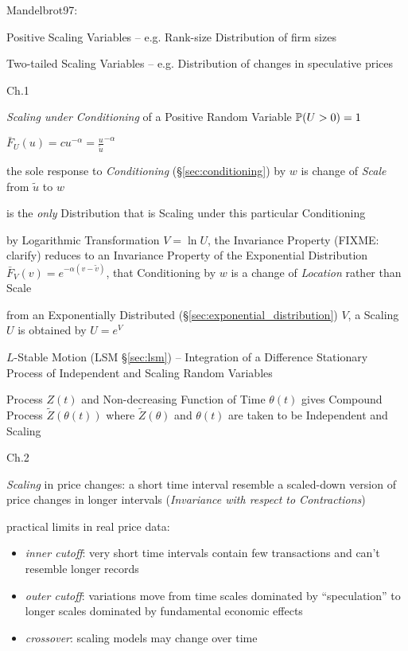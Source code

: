 Mandelbrot97:

Positive Scaling Variables -- e.g. Rank-size Distribution of firm sizes

Two-tailed Scaling Variables -- e.g. Distribution of changes in speculative
prices

Ch.1

\emph{Scaling under Conditioning} of a Positive Random Variable
$\mathbb{P}(U > 0) = 1$

$\bar{F}_U(u) = c u^{-\alpha} = \frac{u}{\tilde{u}}^{-\alpha}$

the sole response to \emph{Conditioning} (\S\ref{sec:conditioning}) by $w$ is
change of \emph{Scale} from $\tilde{u}$ to $w$

is the \emph{only} Distribution that is Scaling under this particular
Conditioning

by Logarithmic Transformation $V = \ln U$, the Invariance Property (FIXME:
clarify) reduces to an Invariance Property of the Exponential Distribution
$\bar{F}_V(v) = e^{-\alpha(v - \tilde{v})}$, that Conditioning by $w$ is a
change of \emph{Location} rather than Scale

from an Exponentially Distributed (\S\ref{sec:exponential_distribution}) $V$, a
Scaling $U$ is obtained by $U = e^V$

\fist $L$-Stable Motion (LSM \S\ref{sec:lsm}) -- Integration of a Difference
Stationary Process of Independent and Scaling Random Variables

Process $Z(t)$ and Non-decreasing Function of Time $\theta(t)$ gives Compound
Process $\tilde{Z}(\theta(t))$ where $\tilde{Z}(\theta)$ and $\theta(t)$ are
taken to be Independent and Scaling

Ch.2

\emph{Scaling} in price changes: a short time interval resemble a scaled-down
version of price changes in longer intervals (\emph{Invariance with respect to
  Contractions})

practical limits in real price data:
\begin{itemize}
  \item \emph{inner cutoff}: very short time intervals contain few transactions
    and can't resemble longer records
  \item \emph{outer cutoff}: variations move from time scales dominated by
    ``speculation'' to longer scales dominated by fundamental economic effects
  \item \emph{crossover}: scaling models may change over time
\end{itemize}

